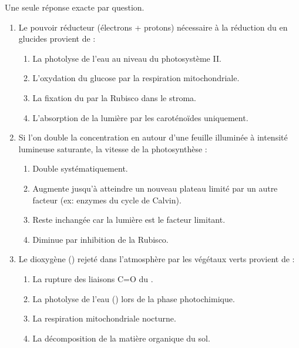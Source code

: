 \documentclass[11pt]{article}
\begin{document}
\begin{exercice}
Une seule réponse exacte par question.
\begin{enumerate}
    \item Le pouvoir réducteur (électrons + protons) nécessaire à la réduction du  en glucides provient de :
    \begin{enumerate}
        \item La photolyse de l'eau au niveau du photosystème II.
        \item L'oxydation du glucose par la respiration mitochondriale.
        \item La fixation du  par la Rubisco dans le stroma.
        \item L'absorption de la lumière par les caroténoïdes uniquement.
    \end{enumerate}
    \item Si l'on double la concentration en  autour d'une feuille illuminée à intensité lumineuse saturante, la vitesse de la photosynthèse :
    \begin{enumerate}
        \item Double systématiquement.
        \item Augmente jusqu'à atteindre un nouveau plateau limité par un autre facteur (ex: enzymes du cycle de Calvin).
        \item Reste inchangée car la lumière est le facteur limitant.
        \item Diminue par inhibition de la Rubisco.
    \end{enumerate}
    \item Le dioxygène () rejeté dans l'atmosphère par les végétaux verts provient de :
    \begin{enumerate}
        \item La rupture des liaisons C=O du .
        \item La photolyse de l'eau () lors de la phase photochimique.
        \item La respiration mitochondriale nocturne.
        \item La décomposition de la matière organique du sol.
    \end{enumerate}
\end{enumerate}
\end{exercice}
\end{document}

